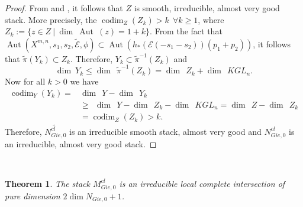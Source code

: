 \documentclass[11pt]{amsart}
\DeclareMathOperator{\codim}{codim}
\DeclareMathOperator{\Aut}{Aut}
\theoremstyle{plain}
\numberwithin{equation}{section}
\theoremstyle{definition}
\theoremstyle{plain}
\newtheorem{Thm}[Def]{Theorem}
\begin{document}
\begin{proof}
From \cite[Proposition 2.1.2]{3a} and \cite[Definition 2.1.2, Remark 2.1.3]{32e}, it follows that $Z$ is smooth, irreducible, almost very good stack. More precisely, the $\codim_Z(Z_k)>k~~\forall k\geq 1$, where $Z_k:=\{z\in Z~|~\dim~\Aut~(z)=1
+k \}$. From the fact that $\Aut(X^{m,n}, s_1, s_2, \tilde{\mathcal E}, \phi)\subset \Aut(h_*(\mathcal E(-s_1-s_2))(p_1+p_2))$, it follows that $\tilde{\pi}(Y_k)\subset Z_k$. Therefore, $Y_k\subset \tilde{\pi}^{-1}(Z_k)$ and \[\dim~Y_k\leq \dim~~\tilde{\pi}^{-1}(Z_k)=\dim ~~Z_k+\dim~~KGL_n.\] Now for all $k>0$ we have \begin{equation*}\begin{split}\codim_Y(Y_k)= & \dim~~ Y-\dim~~ Y_k \\ & \geq ~~\dim~~ Y-\dim~~ Z_k-\dim~~ KGL_n=\dim~~ Z-\dim~~ Z_k \\ & = \codim_Z(Z_k)>k.
\end{split}
\end{equation*}
Therefore, $\widetilde{N^{cl}_{Gie,0}}$ is an irreducible smooth stack, almost very good and $N^{cl}_{Gie,0}$ is an irreducible, almost very good stack. 
\end{proof}

\

\begin{Thm}\label{dim111}
The stack $M^{cl}_{Gie,0}$ is an irreducible local complete intersection of pure dimension $2\dim N_{Gie,0} + 1$.
\end{Thm}
\end{document}
